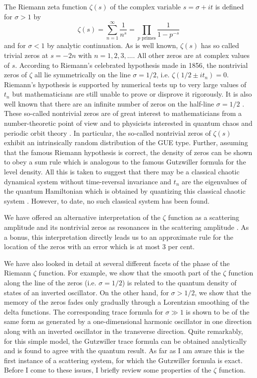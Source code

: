 \documentclass[11pt]{article}
\theoremstyle{plain}
\begin{document}
The Riemann zeta function $\zeta(s)$ of the complex variable $s = \sigma + it$ is defined for $\sigma > 1$ by \cite{edwards1974}
\begin{equation}
\zeta(s) = \sum_{n=1}^{\infty} \frac{1}{n^s} = \prod_{p \text{ primes}} \frac{1}{1-p^{-s}}
\label{eq:zeta_def}
\end{equation}
and for $\sigma < 1$ by analytic continuation. As is well known, $\zeta(s)$ has so called trivial zeros at $s = -2n$ with $n = 1,2,3,\ldots$. All other zeros are at complex values of $s$. According to Riemann's celebrated hypothesis made in 1856, the nontrivial zeros of $\zeta$ all lie symmetrically on the line $\sigma = 1/2$, i.e. $\zeta(1/2 \pm it_n) = 0$. Riemann's hypothesis is supported by numerical tests up to very large values of $t_n$ but mathematicians are still unable to prove or disprove it rigorously. It is also well known that there are an infinite number of zeros on the half-line $\sigma = 1/2$ \cite{hardy1914}. These so-called nontrivial zeros are of great interest to mathematicians from a number-theoretic point of view and to physicists interested in quantum chaos and periodic orbit theory \cite{berry1985,gutzwiller1991,wu1993}. In particular, the so-called nontrivial zeros of $\zeta(s)$ exhibit an intrinsically random distribution of the GUE type. Further, assuming that the famous Riemann hypothesis is correct, the density of zeros can be shown to obey a sum rule which is analogous to the famous Gutzwiller formula for the level density. All this is taken to suggest that there may be a classical chaotic dynamical system without time-reversal invariance and $t_n$ are the eigenvalues of the quantum Hamiltonian which is obtained by quantizing this classical chaotic system \cite{berry1985b,berry1986,sieber1990}. However, to date, no such classical system has been found.

We have offered an alternative interpretation of the $\zeta$ function as a scattering amplitude and its nontrivial zeros as resonances in the scattering amplitude \cite{bhaduri1995a,bhaduri1995b}. As a bonus, this interpretation directly leads us to an approximate rule for the location of the zeros with an error which is at most 3 per cent.

We have also looked in detail at several different facets of the phase of the Riemann $\zeta$ function. For example, we show that the smooth part of the $\zeta$ function along the line of the zeros (i.e. $\sigma = 1/2$) is related to the quantum density of states of an inverted oscillator. On the other hand, for $\sigma > 1/2$, we show that the memory of the zeros fades only gradually through a Lorentzian smoothing of the delta functions. The corresponding trace formula for $\sigma \gg 1$ is shown to be of the same form as generated by a one-dimensional harmonic oscillator in one direction along with an inverted oscillator in the transverse direction. Quite remarkably, for this simple model, the Gutzwiller trace formula can be obtained analytically and is found to agree with the quantum result. As far as I am aware this is the first instance of a scattering system, for which the Gutzwiller formula is exact. Before I come to these issues, I briefly review some properties of the $\zeta$ function.
\end{document}
